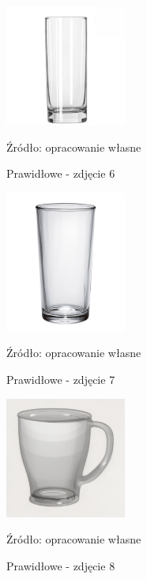 \begin{figure}[htbp]
  \centering
  \caption{Prawidłowe - zdjęcie 6}
  \includegraphics[width=150px]{images/success_6.png}
  \begin{center}
  \footnotesize{Źródło: opracowanie własne}
  \end{center}
  \label{fig:zdjecie_poprawne_6}
\end{figure}

\begin{figure}[htbp]
  \centering
  \caption{Prawidłowe - zdjęcie 7}
  \includegraphics[width=150px]{images/success_7.png}
  \begin{center}
  \footnotesize{Źródło: opracowanie własne}
  \end{center}
  \label{fig:zdjecie_poprawne_1}
\end{figure}

\begin{figure}[htbp]
  \centering
  \caption{Prawidłowe - zdjęcie 8}
  \includegraphics[width=150px]{images/success_8.png}
  \begin{center}
  \footnotesize{Źródło: opracowanie własne}
  \end{center}
  \label{fig:zdjecie_poprawne_8}
\end{figure}

